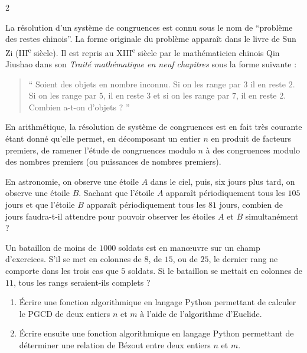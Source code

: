 \documentclass[a4paper,12pt]{article}
\begin{document}
\begin{multicols}{2}
    \begin{history}[title=Histoire : Problème des restes chinois]{}
    La résolution d’un système de congruences est connu sous le nom de ``problème des restes chinois''. La forme originale du problème apparaît dans le livre de Sun Zi (III\textsuperscript{e} siècle). Il est repris au XIII\textsuperscript{e} siècle par le mathématicien chinois Qin Jiushao dans son \emph{Traité mathématique en neuf chapitres} sous la forme suivante :
    \begin{quote}
    `` Soient des objets en nombre inconnu. Si on les range par $3$ il en reste $2$. Si on les range par $5$, il en reste $3$ et si on les range par $7$, il en reste $2$. Combien a-t-on d’objets ? ''
    \end{quote}
    En arithmétique, la résolution de système de congruences est en fait très courante étant donné qu’elle permet, en décomposant un entier $n$ en produit de facteurs premiers, de ramener l’étude de congruences modulo $n$ à des congruences modulo des nombres premiers (ou puissances de nombres premiers).
    \end{history}
    
    \begin{exercice}[title=Exercice 32 $\quad \star \star \star \quad$ { [Modéliser, Calculer, Raisonner] }]{}{}
    En astronomie, on observe une étoile $A$ dans le ciel, puis, six jours plus tard, on observe une étoile $B$. Sachant que l’étoile $A$ apparaît périodiquement tous les $105$ jours et que l’étoile $B$ apparaît périodiquement tous les $81$ jours, combien de jours faudra-t-il attendre pour pouvoir observer les étoiles $A$ et $B$ simultanément ?
    \end{exercice}
    
    \begin{exercice}[title=Exercice 33 $\quad \star \star \star \quad$ { [Modéliser, Calculer, Raisonner] }]{}{}
    Un bataillon de moins de $1000$ soldats est en manœuvre sur un champ d’exercices. S’il se met en colonnes de $8$, de $15$, ou de $25$, le dernier rang ne comporte dans les trois cas que $5$ soldats. Si le bataillon se mettait en colonnes de $11$, tous les rangs seraient-ils complets ?
    \end{exercice}
    
    \begin{exercice}[title=Exercice 34 $\quad \star \star \star \quad$ { [Représenter] }]{}{}
    \begin{enumerate}
        \item Écrire une fonction algorithmique en langage Python permettant de calculer le PGCD de deux entiers $n$ et $m$ à l’aide de l’algorithme d’Euclide.
        \item Écrire ensuite une fonction algorithmique en langage Python permettant de déterminer une relation de Bézout entre deux entiers $n$ et $m$.
    \end{enumerate}
    \end{exercice}
    
\end{multicols}
\end{document}

